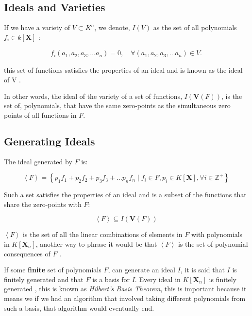 \documentclass[a4paper,11pt,twoside]{article}
\begin{document}
\subsection{Ideals and Varieties}
\label{sec:orga11e9e1}
 If we have a variety of \(V \subset K^n\), we denote, \(I\left( V \right)\) as the set of all
polynomials \(f_i\in k\left[ \textbf{X} \right]\) : \cite[\S 1.1.3]{hibiGrobnerBasesStatistics2014}

\begin{align*}
      f_i\left( a_1, a_2, a_3, \ldots a_n \right) =0, \quad \forall \left( a_1, a_2, a_3, \ldots a_n \right) \in V
.\end{align*}


this set of functions satisfies the properties of an ideal and is known as the ideal of V \cite{coxIdealsVarietiesAlgorithms1997}.

In other words, the ideal of the variety of a set of functions,
\(I\left( \mathbf{V}\left(F\right) \right)\), is the set of,
polynomials, that have the same zero-points as the simultaneous zero
points of all functions in \(F\).

\subsection{Generating Ideals}
\label{sec:org509471c}
The ideal generated by \(F\) is:

\[
    \left\langle F\right\rangle =\left\{
    p_{1}f_{1}+p_{2}f_{2}+p_{3}f_{3}+\ldots p_{n}f_{n}\mid f_{i}\in
    F,p_{i}\in K\left[\boldsymbol{X}\right],\forall
    i\in\mathbb{Z}^{+}\right\}
    \]

Such a set satisfies the properties of an ideal and is a subset
of the functions that share the zero-points with \(F\): \cite[p. 34]{coxIdealsVarietiesAlgorithms1997}

\[
    \left\langle F \right\rangle \subseteq
    I\left(\boldsymbol{V}\left(F\right)\right)
    \]


\(\left\langle F \right\rangle\) is the set of all the linear combinations of elements in \(F\)
with polynomials in \(K\left[\mathbf{X}_n\right]\), another way
to phrase it would be that \(\left\langle F\right\rangle\) is the
set of polynomial consequences of \(F\) \cite[p. 30]{coxIdealsVarietiesAlgorithms1997}.

If some \textbf{finite} set of polynomials \(F\), can generate an ideal
\(I\), it is said that \(I\) is finitely generated and that \(F\)
is a basis for \(I\). Every ideal in
\(K\left[\mathbf{X}_n\right]\) is finitely generated
\cite[p. 77]{coxIdealsVarietiesAlgorithms1997}, this is known
as \emph{Hilbert's Basis Theorem}, this is important because it means we
if we had an algorithm that involved taking different polynomials
from such a basis, that algorithm would eventually end.
\end{document}
